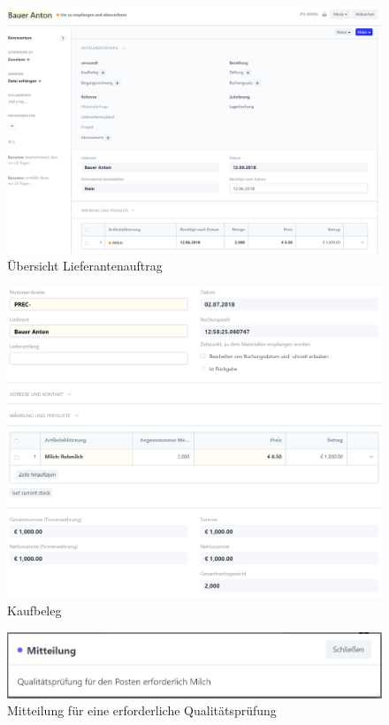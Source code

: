 \begin{figure}[H]
  \centering
  \includegraphics[width=\textwidth]{Bilder/Uebersicht_Lieferantenauftrag.PNG}
  \caption{Übersicht Lieferantenauftrag}
  \label{fig:auftrUebersicht}
\end{figure}
\begin{figure}[H]
  \centering
  \includegraphics[width=\textwidth]{Bilder/Kaufbeleg.PNG}
  \caption{Kaufbeleg}
  \label{fig:kaufbeleg}
\end{figure}
\begin{figure}[H]
  \centering
  \includegraphics[width=\textwidth]{Bilder/Mitteilung_Qualitaetspruefung.PNG}
  \caption{Mitteilung für eine erforderliche Qualitätsprüfung}
  \label{fig:mittQual}
\end{figure}
